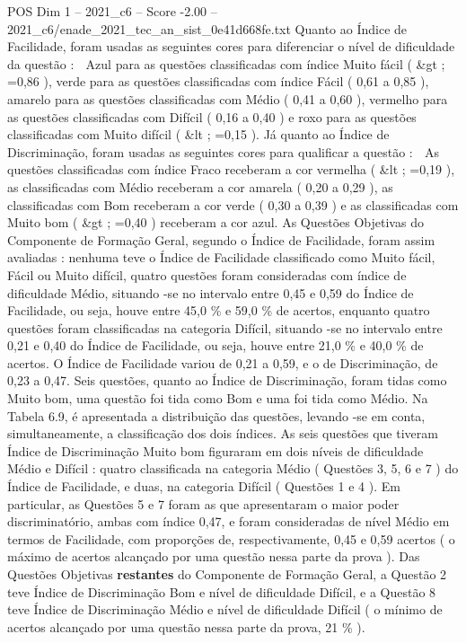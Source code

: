 \begin{textsample}{POS Dim 1 – 2021\_c6 – Score -2.00 – 2021\_c6/enade\_2021\_tec\_an\_sist\_0e41d668fe.txt}
Quanto ao Índice de Facilidade, foram usadas as seguintes cores para diferenciar o nível de dificuldade da questão :  Azul para as questões classificadas com índice Muito fácil ( \&gt ; =0,86 ), verde para as questões classificadas com índice Fácil ( 0,61 a 0,85 ), amarelo para as questões classificadas com Médio ( 0,41 a 0,60 ), vermelho para as questões classificadas com Difícil ( 0,16 a 0,40 ) e roxo para as questões classificadas com Muito difícil ( \&lt ; =0,15 ).
Já quanto ao Índice de Discriminação, foram usadas as seguintes cores para qualificar a questão :  As questões classificadas com índice Fraco receberam a cor vermelha ( \&lt ; =0,19 ), as classificadas com Médio receberam a cor amarela ( 0,20 a 0,29 ), as classificadas com Bom receberam a cor verde ( 0,30 a 0,39 ) e as classificadas com Muito bom ( \&gt ; =0,40 ) receberam a cor azul.
As Questões Objetivas do Componente de Formação Geral, segundo o Índice de Facilidade, foram assim avaliadas : nenhuma teve o Índice de Facilidade classificado como Muito fácil, Fácil ou Muito difícil, quatro questões foram consideradas com índice de dificuldade Médio, situando -se no intervalo entre 0,45 e 0,59 do Índice de Facilidade, ou seja, houve entre 45,0 \% e 59,0 \% de acertos, enquanto quatro questões foram classificadas na categoria Difícil, situando -se no intervalo entre 0,21 e 0,40 do Índice de Facilidade, ou seja, houve entre 21,0 \% e 40,0 \% de acertos.
O Índice de Facilidade variou de 0,21 a 0,59, e o de Discriminação, de 0,23 a 0,47.
Seis questões, quanto ao Índice de Discriminação, foram tidas como Muito bom, uma questão foi tida como Bom e uma foi tida como Médio.
Na Tabela 6.9, é apresentada a distribuição das questões, levando -se em conta, simultaneamente, a classificação dos dois índices.
As seis questões que tiveram Índice de Discriminação Muito bom figuraram em dois níveis de dificuldade Médio e Difícil : quatro classificada na categoria Médio ( Questões 3, 5, 6 e 7 ) do Índice de Facilidade, e duas, na categoria Difícil ( Questões 1 e 4 ).
Em particular, as Questões 5 e 7 foram as que apresentaram o maior poder discriminatório, ambas com índice 0,47, e foram consideradas de nível Médio em termos de Facilidade, com proporções de, respectivamente, 0,45 e 0,59 acertos ( o máximo de acertos alcançado por uma questão nessa parte da prova ).
Das Questões Objetivas \textbf{restantes} do Componente de Formação Geral, a Questão 2 teve Índice de Discriminação Bom e nível de dificuldade Difícil, e a Questão 8 teve Índice de Discriminação Médio e nível de dificuldade Difícil ( o mínimo de acertos alcançado por uma questão nessa parte da prova, 21 \% ).

\end{textsample}
